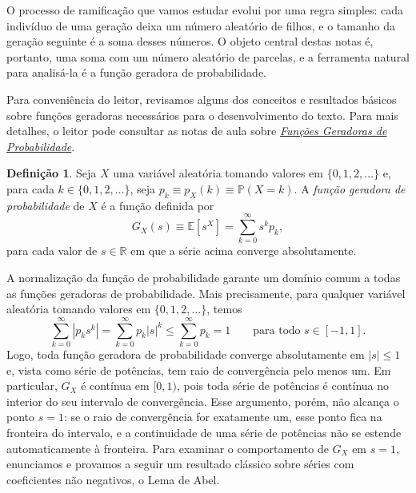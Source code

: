 \documentclass[12pt,portuguese]{article}
\theoremstyle{definition}
\newtheorem{definition}[definition]{Definição}
\theoremstyle{plainexercise}
\theoremstyle{starredexercise}
\theoremstyle{definition}
\begin{document}
O processo de ramificação que vamos estudar evolui por uma regra simples: cada
indivíduo de uma geração deixa um número aleatório de filhos, e o tamanho da
geração seguinte é a soma desses números. O objeto central destas notas é,
portanto, uma soma com um número aleatório de parcelas, e a ferramenta natural
para analisá-la é a função geradora de probabilidade. 

Para conveniência do leitor, revisamos alguns dos conceitos e resultados básicos
sobre funções geradoras necessários para o desenvolvimento do texto.
Para mais detalhes, o leitor pode consultar as notas
de aula sobre \href{https://mat.unb.br/~cioletti/ensino/func-gen-discretas.pdf}{\emph{Funções
Geradoras de Probabilidade}}.

\begin{definition}\label{def:fgp}
Seja $X$ uma variável aleatória tomando valores em $\{0,1,2,\ldots\}$ e, para cada
$k\in\{0,1,2,\ldots\}$, seja $p_k\equiv p_X(k)\equiv \mathbb{P}(X=k)$. A \emph{função
geradora de probabilidade} de $X$ é a função
definida por
\begin{equation}\label{eq:def-fgp}
G_X(s)\equiv \mathbb{E}[s^X] =\sum_{k=0}^{\infty}s^k p_k,
\end{equation}
para cada valor de $s\in\mathbb{R}$ em que a série acima converge absolutamente.
\end{definition}

A normalização da função de probabilidade garante um domínio comum a todas as
funções geradoras de probabilidade.
Mais precisamente, para qualquer variável aleatória
tomando valores em $\{0,1,2,\ldots\}$, temos
\begin{equation}\label{eq:fgp-convergencia}
\sum_{k=0}^{\infty}|p_k s^k|
=\sum_{k=0}^{\infty}p_k|s|^k
\leqslant\sum_{k=0}^{\infty}p_k=1
\qquad \text{para todo } s\in [-1,1].
\end{equation}
Logo, toda função geradora de probabilidade
converge absolutamente em $|s|\leqslant 1$ e, vista como série
de potências, tem raio de convergência pelo menos um. Em particular,
$G_X$ é contínua em $[0,1)$, pois toda série de potências é contínua no
interior do seu intervalo de convergência. Esse argumento, porém, não alcança
o ponto $s=1$: se o raio de convergência for exatamente um, esse ponto fica
na fronteira do intervalo, e a continuidade de uma série de potências não se
estende automaticamente à fronteira. Para examinar o comportamento de $G_X$
em $s=1$, enunciamos e provamos a seguir um resultado clássico sobre séries
com coeficientes não negativos, o Lema de Abel.
\end{document}
